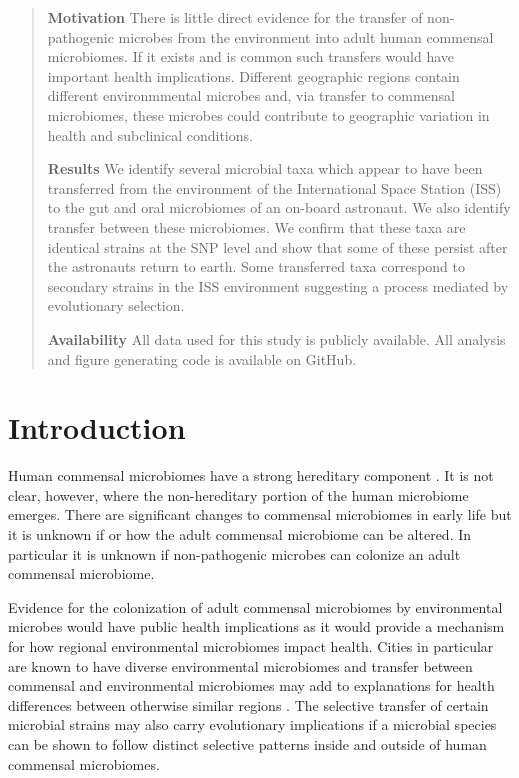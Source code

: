 \begin{abstract}

\textbf{Motivation}  There is little direct evidence for the transfer of non-pathogenic microbes from the environment into adult human commensal microbiomes. If it exists and is common such transfers would have important health implications. Different geographic regions contain different environmmental microbes and, via transfer to commensal microbiomes, these microbes could contribute to geographic variation in health and subclinical conditions.

\textbf{Results} We identify several microbial taxa which appear to have been transferred from the environment of the International Space Station (ISS) to the gut and oral microbiomes of an on-board astronaut. We also identify transfer between these microbiomes. We confirm that these taxa are identical strains at the SNP level and show that some of these persist after the astronauts return to earth. Some transferred taxa correspond to secondary strains in the ISS environment suggesting a process mediated by evolutionary selection.

\textbf{Availability} All data used for this study is publicly available. All analysis and figure generating code is available on GitHub.

\end{abstract}

\section{Introduction}

Human commensal microbiomes have a strong hereditary component \citep{Goodrich2016}. It is not clear, however, where the non-hereditary portion of the human microbiome emerges. There are significant changes to commensal microbiomes in early life but it is unknown if or how the adult commensal microbiome can be altered. In particular it is unknown if non-pathogenic microbes can colonize an adult commensal microbiome.

Evidence for the colonization of adult commensal microbiomes by environmental microbes would have public health implications as it would provide a mechanism for how regional environmental microbiomes impact health. Cities in particular are known to have diverse environmental microbiomes \citep{danko2019global} and transfer between commensal and environmental microbiomes may add to explanations for health differences between otherwise similar regions \citep{Nicolaou2005}. The selective transfer of certain microbial strains may also carry evolutionary implications if a microbial species can be shown to follow distinct selective patterns inside and outside of human commensal microbiomes. 

